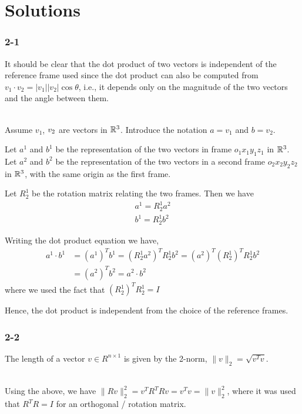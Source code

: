 \chapter[Chapter 2]{Solutions}

\subsection*{2-1}

It should be clear that the dot product of two vectors is independent of the reference frame used since the dot product can also be computed from $v_1 \cdot v_2 = |v_1| |v_2| \cos\theta$, i.e., it depends only on the magnitude of the two vectors and the angle between them.
\\~


Assume $v_1$, $v_2\space$ are vectors in $\mathbb{R}^3$. Introduce the notation $a=v_1$ and $b=v_2$.


Let $a^1$ and $b^1$ be the representation of the two vectors in frame $o_1x_1y_1z_1$ in $\mathbb{R}^3$.
Let $a^2$ and $b^2$ be the representation of the two vectors in a second frame $o_2x_2y_2z_2$ in $\mathbb{R}^3$, with the same origin as the first frame.

Let $R^1_2$ be the rotation matrix relating the two frames. Then we have 
\begin{align*} 
a^1 = R^1_2 a^2 \\ 
b^1 = R^1_2 b^2
\end{align*}

Writing the dot product equation we have, 
\begin{align*} 
a^1 \cdot b^1 &= (a^1)^T b^1 = (R^1_2 a^2)^T  R^1_2 b^2 = (a^2)^T (R^1_2)^T  R^1_2 b^2 \\
&= (a^2)^T b^2 = a^2 \cdot b^2 
\end{align*}
where we used the fact that $(R^1_2)^T  R^1_2 =I$

Hence, the dot product is independent from the choice of the reference frames.

\subsection*{2-2}

The length of a vector $v\in R^{n \times 1}$ is given by the 2-norm, $\|v\|_2 = \sqrt{v^Tv}$.\\~

Using the above, we have $\|Rv\|^2_2=v^TR^TRv=v^Tv=\|v\|_2^2$, where it was used that $R^TR=I$ for an orthogonal / rotation matrix.

